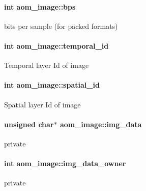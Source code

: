 \paragraph[{\texorpdfstring{bps}{bps}}]{\setlength{\rightskip}{0pt plus 5cm}int aom\+\_\+image\+::bps}\hypertarget{structaom__image_a8b3396eaa38cbc62a90bfccd00b93b5a}{}\label{structaom__image_a8b3396eaa38cbc62a90bfccd00b93b5a}
bits per sample (for packed formats) 
\paragraph[{\texorpdfstring{temporal\+\_\+id}{temporal_id}}]{\setlength{\rightskip}{0pt plus 5cm}int aom\+\_\+image\+::temporal\+\_\+id}\hypertarget{structaom__image_a11c7cb24c961e9bdcf25977a5dc53a40}{}\label{structaom__image_a11c7cb24c961e9bdcf25977a5dc53a40}
Temporal layer Id of image 
\paragraph[{\texorpdfstring{spatial\+\_\+id}{spatial_id}}]{\setlength{\rightskip}{0pt plus 5cm}int aom\+\_\+image\+::spatial\+\_\+id}\hypertarget{structaom__image_a1c3a59a1de1895da27135d04218f961a}{}\label{structaom__image_a1c3a59a1de1895da27135d04218f961a}
Spatial layer Id of image 
\paragraph[{\texorpdfstring{img\+\_\+data}{img_data}}]{\setlength{\rightskip}{0pt plus 5cm}unsigned char$\ast$ aom\+\_\+image\+::img\+\_\+data}\hypertarget{structaom__image_a7c367f3227d5876ce9e5c198a01c2028}{}\label{structaom__image_a7c367f3227d5876ce9e5c198a01c2028}
private 
\paragraph[{\texorpdfstring{img\+\_\+data\+\_\+owner}{img_data_owner}}]{\setlength{\rightskip}{0pt plus 5cm}int aom\+\_\+image\+::img\+\_\+data\+\_\+owner}\hypertarget{structaom__image_ad29ed1ce3206c77ade67a76b69ee339e}{}\label{structaom__image_ad29ed1ce3206c77ade67a76b69ee339e}
private 
